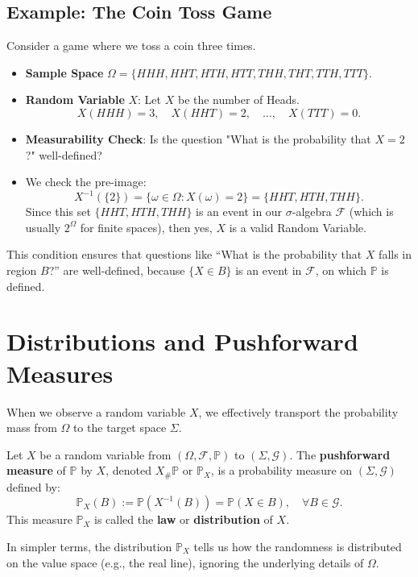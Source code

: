 \subsection{Example: The Coin Toss Game}
Consider a game where we toss a coin three times.
\begin{itemize}
    \item \textbf{Sample Space} $\Omega = \{HHH, HHT, HTH, HTT, THH, THT, TTH, TTT\}$.
    \item \textbf{Random Variable} $X$: Let $X$ be the number of Heads.
    \[
    X(HHH) = 3, \quad X(HHT) = 2, \quad \dots, \quad X(TTT) = 0.
    \]
    \item \textbf{Measurability Check}: Is the question "What is the probability that $X=2$?" well-defined?
    \item We check the pre-image:
    \[
    X^{-1}(\{2\}) = \{ \omega \in \Omega : X(\omega) = 2 \} = \{ HHT, HTH, THH \}.
    \]
    Since this set $\{HHT, HTH, THH\}$ is an event in our $\sigma$-algebra $\mathcal{F}$ (which is usually $2^\Omega$ for finite spaces), then yes, $X$ is a valid Random Variable.
\end{itemize}

This condition ensures that questions like ``What is the probability that $X$ falls in region $B$?'' are well-defined, because $\{X \in B\}$ is an event in $\mathcal{F}$, on which $\mathbb{P}$ is defined.

\section{Distributions and Pushforward Measures}

When we observe a random variable $X$, we effectively transport the probability mass from $\Omega$ to the target space $\Sigma$.

\begin{definition}
Let $X$ be a random variable from $(\Omega, \mathcal{F}, \mathbb{P})$ to $(\Sigma, \mathcal{G})$. The \textbf{pushforward measure} of $\mathbb{P}$ by $X$, denoted $X_{\#} \mathbb{P}$ or $\mathbb{P}_X$, is a probability measure on $(\Sigma, \mathcal{G})$ defined by:
\[
\mathbb{P}_X(B) := \mathbb{P}(X^{-1}(B)) = \mathbb{P}(X \in B), \quad \forall B \in \mathcal{G}.
\]
This measure $\mathbb{P}_X$ is called the \textbf{law} or \textbf{distribution} of $X$.
\end{definition}
In simpler terms, the distribution $\mathbb{P}_X$ tells us how the randomness is distributed on the value space (e.g., the real line), ignoring the underlying details of $\Omega$.

